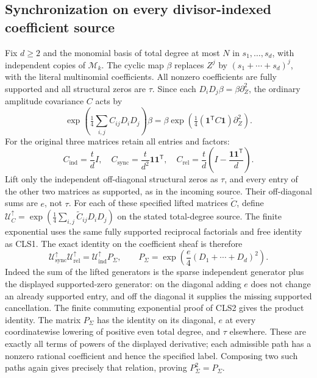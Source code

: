 \documentclass[11pt,a4paper]{article}
\theoremstyle{definition}\newtheorem{definition}[theorem]{Definition}
\begin{document}
\subsection{Synchronization on every divisor-indexed coefficient source}
Fix $d\ge2$ and the monomial basis of total degree at most $N$
in $s_1,\ldots,s_d$, with independent copies of $\mathcal M_k$.
The cyclic map $\beta$ replaces $Z^j$ by
$(s_1+\cdots+s_d)^j$, with the literal multinomial coefficients.
All nonzero coefficients are fully supported and all structural
zeros are $\tau$. Since each $D_iD_j\beta=\beta\partial_Z^2$,
the ordinary amplitude covariance $C$ acts by
\begin{equation}\tag{CLS9}
 \exp\left(\tfrac14\sum_{i,j}C_{ij}D_iD_j\right)\beta
 =\beta\exp\left(\tfrac14(\mathbf1^{\mathsf T}C\mathbf1)
                                           \partial_Z^2\right).
\end{equation}
For the original three matrices retain all entries and factors:
\begin{equation}\tag{CLS10}
 C_{\mathrm{ind}}=\frac td I,
 \quad C_{\mathrm{sync}}=\frac t{d^2}\mathbf1\mathbf1^{\mathsf T},
 \quad C_{\mathrm{rel}}=\frac td
       \left(I-\frac{\mathbf1\mathbf1^{\mathsf T}}d\right).
\end{equation}
Lift only the independent off-diagonal structural zeros as $\tau$,
and every entry of the other two matrices as supported, as in the
incoming source. Their off-diagonal sums are $e$, not $\tau$.
For each of these specified lifted matrices $\widetilde C$, define
$\mathcal U_C^\uparrow=
\exp(\tfrac14\sum_{i,j}\widetilde C_{ij}D_iD_j)$ on the stated
total-degree source. The finite exponential uses the same fully
supported reciprocal factorials and free identity as CLS1.
The exact identity on the coefficient sheaf is therefore
\begin{equation}\tag{CLS11}
 \mathcal U_{\mathrm{sync}}^\uparrow
 \mathcal U_{\mathrm{rel}}^\uparrow
 =\mathcal U_{\mathrm{ind}}^\uparrow P_\Sigma,
 \qquad
 P_\Sigma=\exp\left(\frac e4
                         (D_1+\cdots+D_d)^2\right).
\end{equation}
Indeed the sum of the lifted generators is the sparse independent
generator plus the displayed supported-zero generator: on the diagonal
adding $e$ does not change an already supported entry, and off the
diagonal it supplies the missing supported cancellation. The finite
commuting exponential proof of CLS2 gives the product identity.
The matrix $P_\Sigma$ has the identity on its diagonal, $e$ at
every coordinatewise lowering of positive even total degree, and
$\tau$ elsewhere. These are exactly all terms of powers of the
displayed derivative; each admissible path has a nonzero rational
coefficient and hence the specified label. Composing two such paths
again gives precisely that relation, proving $P_\Sigma^2=P_\Sigma$.
\end{document}
